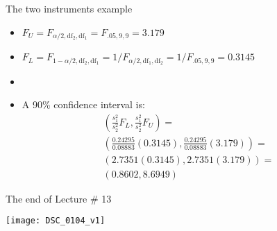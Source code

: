 \documentclass[xcolor=dvipsnames]{beamer}
\begin{document}
\begin{frame}{The two instruments example}
	\begin{itemize}
		\item $F_U = F_{\alpha / 2, \text{df}_2, \text{df}_1}=F_{.05, 9, 9}= 3.179$
		\item $F_L = F_{1-\alpha / 2, \text{df}_2, \text{df}_1} = 1 / F_{\alpha / 2, \text{df}_1, \text{df}_2} = 1 / F_{.05, 9, 9} = 0.3145$
		\item[]
		\item A 90\% confidence interval is:
		\begin{gather*}
		\left(\frac{s_1^2}{s_2^2} F_L, \frac{s_1^2}{s_2^2} F_U \right)=\\
		 \left(\frac{0.24295}{0.08883} (0.3145), \frac{0.24295}{0.08883} (3.179)\right) =\\
		 \left(2.7351(0.3145), 2.7351 (3.179)\right) = \\
		 (0.8602, 8.6949)
		\end{gather*}
	\end{itemize}
\end{frame}

\begin{frame}{The end of Lecture \# 13}
	\begin{center}
		\texttt{[image: DSC\_0104\_v1]}
	\end{center}
\end{frame}
\end{document}
